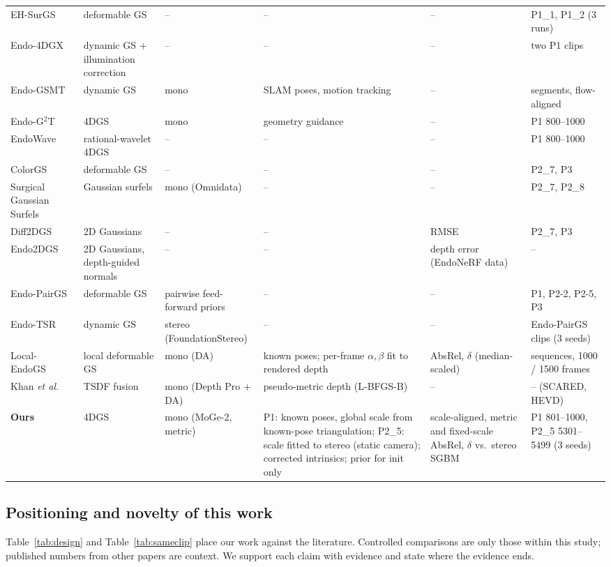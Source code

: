 \documentclass[conference]{IEEEtran}
\begin{document}
\begin{table}[t]
\begin{tabular}{@{}>{\raggedright}p{2.55cm}>{\raggedright}p{2.6cm}>{\raggedright}p{2.35cm}>{\raggedright}p{3.75cm}>{\raggedright}p{2.6cm}>{\raggedright\arraybackslash}p{3.1cm}@{}}
EH-SurGS~\cite{shan2025ehsurgs} & deformable GS & -- & -- & -- & P1\_1, P1\_2 (3 runs) \\
Endo-4DGX~\cite{huang2025endo4dgx} & dynamic GS + illumination correction & -- & -- & -- & two P1 clips \\
Endo-GSMT~\cite{gou2025endogsmt} & dynamic GS & mono & SLAM poses, motion tracking & -- & 5 segments, flow-aligned \\
Endo-G$^2$T~\cite{liu2025endog2t} & 4DGS & mono & geometry guidance & -- & P1 800--1000 \\
EndoWave~\cite{wu2025endowave} & rational-wavelet 4DGS & -- & -- & -- & P1 800--1000 \\
ColorGS~\cite{ji2025colorgs} & deformable GS & -- & -- & -- & P2\_7, P3 \\
Surgical Gaussian Surfels~\cite{sunmola2026sgs} & Gaussian surfels & mono (Omnidata) & -- & -- & P2\_7, P2\_8 \\
Diff2DGS~\cite{song2026diff2dgs} & 2D Gaussians & -- & -- & RMSE & P2\_7, P3 \\
Endo2DGS~\cite{zhou2026endo2dgs} & 2D Gaussians, depth-guided normals & -- & -- & depth error (EndoNeRF data) & -- \\
Endo-PairGS~\cite{yu2026endopairgs} & deformable GS & pairwise feed-forward priors & -- & -- & P1, P2-2, P2-5, P3 \\
Endo-TSR~\cite{wu2026endotsr} & dynamic GS & stereo (FoundationStereo) & -- & -- & Endo-PairGS clips (3 seeds) \\
Local-EndoGS~\cite{shan2026localendogs} & local deformable GS & mono (DA) & known poses; per-frame $\alpha,\beta$ fit to rendered depth & AbsRel, $\delta$ (median-scaled) & 2 sequences, 1000 / 1500 frames \\
Khan \emph{et al.}~\cite{khan2025unifying} & TSDF fusion & mono (Depth Pro + DA) & pseudo-metric depth (L-BFGS-B) & -- & -- (SCARED, HEVD) \\
\rowcolor{ours!12} \textbf{Ours} & 4DGS & mono (MoGe-2, metric) & P1: known poses, global scale from known-pose triangulation; P2\_5: scale fitted to stereo (static camera); corrected intrinsics; prior for init only & scale-aligned, metric and fixed-scale AbsRel, $\delta$ vs.\ stereo SGBM & P1 801--1000, P2\_5 5301--5499 (3 seeds) \\
\bottomrule
\end{tabular}
\end{table}

\subsection{Positioning and novelty of this work}
Table~\ref{tab:design} and Table~\ref{tab:sameclip} place our work against the literature. Controlled comparisons are only those within this study; published numbers from other papers are context. We support each claim with evidence and state where the evidence ends.
\end{document}
